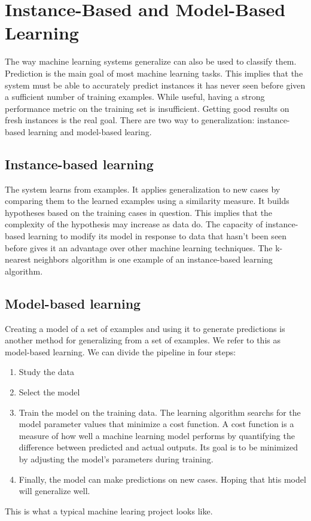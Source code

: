 \section{Instance-Based and Model-Based Learning}
The way machine learning systems generalize can also be used to classify them. Prediction is the main goal of most machine learning tasks.
This implies that the system must be able to accurately predict instances it has never seen before given a sufficient number of training examples. 
While useful, having a strong performance metric on the training set is insufficient. Getting good results on fresh instances is the real goal. 
There are two way to generalization: instance-based learning and model-based learing. 

\subsection{Instance-based learning}
The system learns from examples. It applies generalization to new cases by comparing them to the learned examples using a similarity measure. 
It builds hypotheses based on the training cases in question. This implies that the complexity of the hypothesis may increase as data do. 
The capacity of instance-based learning to modify its model in response to data that hasn't been seen before gives it an advantage over other machine learning techniques. 
The k-nearest neighbors algorithm is one example of an instance-based learning algorithm.

\subsection{Model-based learning}
Creating a model of a set of examples and using it to generate predictions is another method for generalizing from a set of examples. We refer to this as model-based learning.
We can divide the pipeline in four steps: 
\begin{enumerate}
    \item Study the data
    \item Select the model
    \item Train the model on the training data. The learning algorithm searchs for the model parameter values that minimize a cost function. 
    A cost function is a measure of how well a machine learning model performs by quantifying the difference between predicted and actual outputs. Its goal is to be minimized by adjusting the model's parameters during training.
    \item Finally, the model can make predictions on new cases. Hoping that htis model will generalize well.
\end{enumerate}

This is what a typical machine learing project looks like.